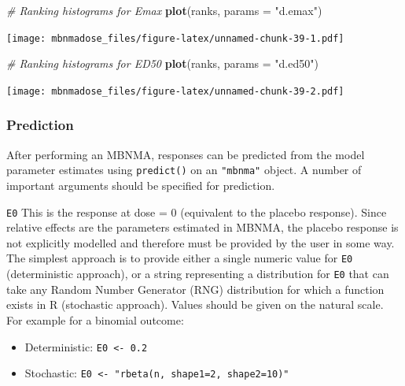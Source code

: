 \documentclass[]{article}
\newenvironment{Shaded}{\begin{snugshade}}{\end{snugshade}}
\newcommand{\CommentTok}[1]{\textcolor[rgb]{0.56,0.35,0.01}{\textit{#1}}}
\newcommand{\DataTypeTok}[1]{\textcolor[rgb]{0.13,0.29,0.53}{#1}}
\newcommand{\KeywordTok}[1]{\textcolor[rgb]{0.13,0.29,0.53}{\textbf{#1}}}
\newcommand{\NormalTok}[1]{#1}
\newcommand{\StringTok}[1]{\textcolor[rgb]{0.31,0.60,0.02}{#1}}
\providecommand{\tightlist}{%
  \setlength{\itemsep}{0pt}\setlength{\parskip}{0pt}}
\begin{document}
\begin{Shaded}
\begin{Highlighting}[]
\CommentTok{# Ranking histograms for Emax}
\KeywordTok{plot}\NormalTok{(ranks, }\DataTypeTok{params =} \StringTok{"d.emax"}\NormalTok{)}
\end{Highlighting}
\end{Shaded}

\texttt{[image: mbnmadose\_files/figure-latex/unnamed-chunk-39-1.pdf]}

\begin{Shaded}
\begin{Highlighting}[]

\CommentTok{# Ranking histograms for ED50}
\KeywordTok{plot}\NormalTok{(ranks, }\DataTypeTok{params =} \StringTok{"d.ed50"}\NormalTok{)}
\end{Highlighting}
\end{Shaded}

\texttt{[image: mbnmadose\_files/figure-latex/unnamed-chunk-39-2.pdf]}

\hypertarget{prediction}{%
\subsubsection{Prediction}\label{prediction}}

After performing an MBNMA, responses can be predicted from the model
parameter estimates using \texttt{predict()} on an \texttt{"mbnma"}
object. A number of important arguments should be specified for
prediction.

\texttt{E0} This is the response at dose = 0 (equivalent to the placebo
response). Since relative effects are the parameters estimated in MBNMA,
the placebo response is not explicitly modelled and therefore must be
provided by the user in some way. The simplest approach is to provide
either a single numeric value for \texttt{E0} (deterministic approach),
or a string representing a distribution for \texttt{E0} that can take
any Random Number Generator (RNG) distribution for which a function
exists in R (stochastic approach). Values should be given on the natural
scale. For example for a binomial outcome:

\begin{itemize}
\tightlist
\item
  Deterministic: \texttt{E0\ \textless{}-\ 0.2}
\item
  Stochastic:
  \texttt{E0\ \textless{}-\ "rbeta(n,\ shape1=2,\ shape2=10)"}
\end{itemize}
\end{document}
